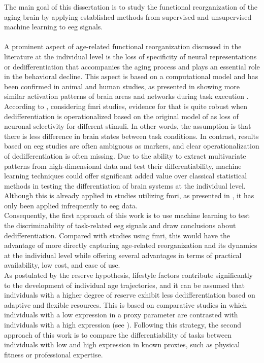 The main goal of this dissertation is to study the functional reorganization of the aging brain by applying established methods from supervised and unsupervised machine learning to \gls{eeg} signals.\\
\\
A prominent aspect of age-related functional reorganization discussed in the literature at the individual level is the loss of specificity of neural representations or dedifferentiation that accompanies the aging process and plays an essential role in the behavioral decline. This aspect is based on a computational model and has been confirmed in animal and human studies, as presented in  showing more similar activation patterns of brain areas and networks during task execution \cite{Carb2011, Rieck2021, Antonenko2013, Geerligs2014}. According to \citeauthor{Koen2019}, considering \gls{fmri} studies, evidence for that is quite robust when dedifferentiation is operationalized based on the original model of \citeauthor{Li2001} \cite{Li2001,Li2002} as loss of neuronal selectivity for different stimuli. In other words, the assumption is that there is less difference in brain states between task conditions. In contrast, results based on \gls{eeg} studies are often ambiguous as markers, and clear operationalization of dedifferentiation is often missing. 
Due to the ability to extract multivariate patterns from high-dimensional data and test their differentiability, machine learning techniques could offer significant added value over classical statistical methods in testing the differentiation of brain systems at the individual level. Although this is already applied in studies utilizing \gls{fmri}, as presented in , it has only been applied infrequently to \gls{eeg} data.\\
Consequently, the first approach of this work is to use machine learning to test the discriminability of task-related \gls{eeg} signals and draw conclusions about dedifferentiation. Compared with studies using \gls{fmri}, this would have the advantage of more directly capturing age-related reorganization and its dynamics at the individual level while offering several advantages in terms of practical availability, low cost, and ease of use.\\
As postulated by the reserve hypothesis, lifestyle factors contribute significantly to the development of individual age trajectories, and it can be assumed that individuals with a higher degree of reserve exhibit less dedifferentiation based on adaptive and flexible resources. This is based on comparative studies in which individuals with a low expression in a proxy parameter are contrasted with individuals with a high expression (see ). Following this strategy, the second approach of this work is to compare the differentiability of tasks between individuals with low and high expression in known proxies, such as physical fitness or professional expertise.\\
